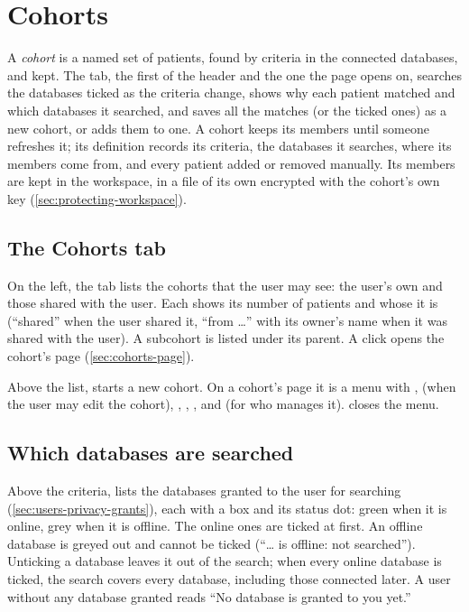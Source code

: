 \chapter{Cohorts}
\label{chap:cohorts}

A \emph{cohort} is a named set of patients, found by criteria in the connected databases, and
kept. The  tab, the first of the header and the one the page opens on, searches the
databases ticked as the criteria change, shows why each patient matched and which databases it
searched, and saves all the matches (or the ticked ones) as a new cohort, or adds them to one. A
cohort keeps its members until someone refreshes it; its definition records its criteria, the
databases it searches, where its members come from, and every patient added or removed manually.
Its members are kept in the workspace, in a file of its own encrypted with the cohort's own key
(\cref{sec:protecting-workspace}).


\section{The Cohorts tab}
\label{sec:cohorts-tab}

On the left, the tab lists the cohorts that the user may see: the user's own and those shared
with the user. Each shows its number of patients and whose it is (``shared'' when the user
shared it, ``from \dots'' with its owner's name when it was shared with the user). A subcohort
is listed under its parent. A click opens the cohort's page (\cref{sec:cohorts-page}).

Above the list,  starts a new cohort. On a cohort's page it is a menu with
,  (when the user may edit the cohort), , , , and  (for who manages
it).  closes the menu.

\section{Which databases are searched}
\label{sec:cohorts-search-in}

Above the criteria,  lists the databases granted to the user for searching
(\cref{sec:users-privacy-grants}), each with a box and its status dot: green when it is online,
grey when it is offline. The online ones are ticked at first. An offline database is greyed out
and cannot be ticked (``\dots{} is offline: not searched''). Unticking a database leaves it out
of the search; when every online database is ticked, the search covers every database, including
those connected later. A user without any database granted reads ``No database is granted to you
yet.''

